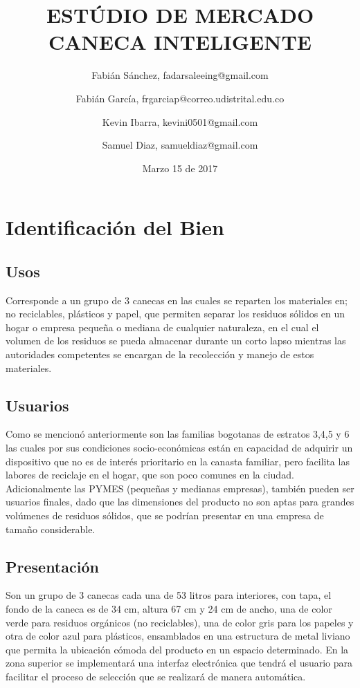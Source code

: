 \documentclass[letterpaper,12pt]{scrreprt}
\title{ESTÚDIO DE MERCADO CANECA INTELIGENTE}
\author{Fabián Sánchez, fadarsaleeing@gmail.com \and Fabián García, frgarciap@correo.udistrital.edu.co \and Kevin Ibarra, kevini0501@gmail.com \and Samuel Diaz, samueldiaz@gmail.com}
\date{Marzo 15 de 2017}
\begin{document}
\maketitle


 \tableofcontents



\chapter{Identificación del Bien}

    \section{Usos}
    Corresponde a un grupo de 3 canecas en las cuales se reparten los materiales en; no reciclables, plásticos y papel, que permiten separar los residuos sólidos en un hogar o empresa pequeña o mediana de cualquier naturaleza, en el cual el volumen de los residuos se pueda almacenar durante un corto lapso mientras las autoridades competentes se encargan de la recolección y manejo de estos materiales.

    \section{Usuarios}
    Como se mencionó anteriormente son las familias bogotanas de estratos 3,4,5 y 6 las cuales por sus condiciones socio-económicas están en capacidad de adquirir un dispositivo que no es de interés prioritario en la canasta familiar, pero facilita las labores de reciclaje en el hogar, que son poco comunes en la ciudad. Adicionalmente las PYMES (pequeñas y medianas empresas), también pueden ser usuarios finales, dado que las dimensiones del producto no son aptas para grandes volúmenes de residuos sólidos, que se podrían presentar en una empresa de tamaño considerable.

    \section{Presentación}
    Son un grupo de 3 canecas cada una de 53 litros para interiores, con tapa, el fondo de la caneca es de 34 cm, altura 67 cm y 24 cm de ancho, una de color verde para residuos orgánicos (no reciclables), una de color gris para los papeles y otra de color azul para plásticos, ensamblados en una estructura de metal liviano que permita la ubicación cómoda del producto en un espacio determinado. En la zona superior se implementará una interfaz electrónica que tendrá el usuario para facilitar el proceso de selección que se realizará de manera automática.
\end{document}
